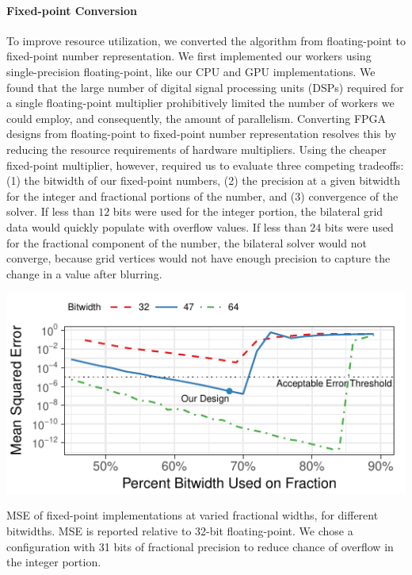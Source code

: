 \paragraph{Fixed-point Conversion} To improve resource utilization, we converted the algorithm from floating-point to fixed-point number representation.
We first implemented our workers using single-precision floating-point, like our CPU and GPU implementations.
We found that the large number of digital signal processing units (DSPs) required for a single floating-point multiplier prohibitively limited the number of workers we could employ, and consequently, the amount of parallelism.
Converting FPGA designs from floating-point to fixed-point number representation resolves this by reducing the resource requirements of hardware multipliers.
Using the cheaper fixed-point multiplier, however, required us to evaluate three competing tradeoffs: (1) the bitwidth of our fixed-point numbers, (2) the precision at a given bitwidth for the integer and fractional portions of the number, and (3) convergence of the solver.
If less than $12$ bits were used for the integer portion, the bilateral grid data would quickly populate with overflow values.
If less than $24$ bits were used for the fractional component of the number, the bilateral solver would not converge, because grid vertices would not have enough precision to capture the change in a value after blurring.

\begin{marginfigure}
  \centering
  \includegraphics[width=\columnwidth]{hfbs-figs/fixed_point.pdf}
  \caption{MSE of fixed-point implementations at varied fractional widths, for different bitwidths. MSE is reported relative to 32-bit floating-point. We chose a configuration with 31 bits of fractional precision to reduce chance of overflow in the integer portion.}
  \label{fig:fixed-point}
\end{marginfigure}

